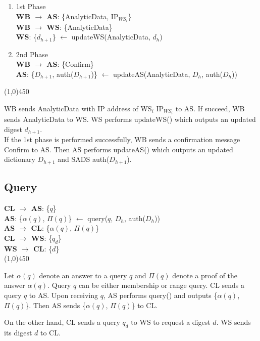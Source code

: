 \begin{framed}
\begin{enumerate}
\item{1st Phase}\\
\textbf{WB $\rightarrow$ AS}: \textsf{\{AnalyticData, IP$_{WS_i}$\}}	\\
\textbf{WB $\rightarrow$ WS}: \textsf{\{AnalyticData\}}	\\
\textbf{WS}: \textsf{\{$d_{h+1}$\} $\leftarrow$ updateWS(AnalyticData, $d_h$)}	

\item{2nd Phase}\\
\textbf{WB $\rightarrow$ AS}: \textsf{\{Confirm\}}	\\
\textbf{AS}: \textsf{\{$D_{h+1}$, auth($D_{h+1}$)\} $\leftarrow$ updateAS(AnalyticData, $D_h$, auth($D_h$))}
\end{enumerate}
\line(1,0){450}

\noindent
\textsf{WB} sends \textsf{AnalyticData} with IP address of \textsf{WS$_i$} \textsf{IP$_{WS_i}$} to \textsf{AS}. 
If succeed, \textsf{WB} sends \textsf{AnalyticData} to \textsf{WS}. 
\textsf{WS} performs \textsf{updateWS()} which outputs an updated digest \textsf{$d_{h+1}$}. \\
If the 1st phase is performed successfully, \textsf{WB} sends a confirmation message \textsf{Confirm} to \textsf{AS}. 
Then \textsf{AS} performs \textsf{updateAS()} which outputs an updated dictionary \textsf{$D_{h+1}$} and SADS \textsf{auth($D_{h+1}$)}.
\end{framed}

\subsection{Query}
\begin{framed}
\noindent
\textbf{CL $\rightarrow$ AS}: \textsf{\{$q$\}}	\\
\textbf{AS}: \textsf{\{$\alpha(q)$, $\Pi(q)$\} $\leftarrow$ query($q$, $D_h$, auth($D_h$))}	\\
\textbf{AS $\rightarrow$ CL}: \textsf{\{$\alpha(q)$, $\Pi(q)$\}}	\\

\noindent
\textbf{CL $\rightarrow$ WS}: \textsf{\{$q_{d}$\}}	\\
\textbf{WS $\rightarrow$ CL}: \textsf{\{$d$\}}	\\
\line(1,0){450}

\noindent
Let $\alpha(q)$ denote an answer to a query $q$ and $\Pi(q)$ denote a proof of the answer $\alpha(q)$. 
Query $q$ can be either membership or range query. 
\textsf{CL} sends a query $q$ to \textsf{AS}. 
Upon receiving $q$, \textsf{AS} performs \textsf{query()} and outputs \textsf{\{$\alpha(q)$, $\Pi(q)$\}}.
Then \textsf{AS} sends \textsf{\{$\alpha(q)$, $\Pi(q)$\}} to \textsf{CL}.

\noindent
On the other hand, \textsf{CL} sends a query $q_d$ to \textsf{WS} to request a digest $d$. 
\textsf{WS} sends its digest \textsf{$d$} to \textsf{CL}.
\end{framed}

